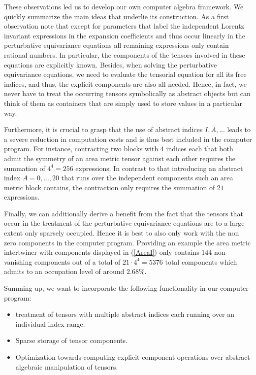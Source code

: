 These observations led us to develop our own computer algebra framework. We quickly summarize the main ideas that underlie its construction.
As a first observation note that except for parameters that label the independent Lorentz invariant expressions in the expansion coefficients and thus occur linearly in the perturbative equivariance equations all remaining expressions only contain rational numbers. In particular, the components of the tensors involved in these equations are explicitly known. Besides, when solving the perturbative equivariance equations, we need to evaluate the tensorial equation for all its free indices, and thus, the explicit components are also all needed. Hence, in fact, we never have to treat the occurring tensors symbolically as abstract objects but can think of them as containers that are simply used to store values in a particular way. 

Furthermore, it is crucial to grasp that the use of abstract indices $I, A, ...$ leads to a severe reduction in computation costs and is thus best included in the computer program. For instance, contracting two blocks with $4$ indices each that both admit the symmetry of an area metric tensor against each other requires the summation of $4^4 = 256$ expressions. In contrast to that introducing an abstract index $A = 0,...,20$ that runs over the independent components such an area metric block contains, the contraction only requires the summation of $21$ expressions.

Finally, we can additionally derive a benefit from the fact that the tensors that occur in the treatment of the perturbative equivariance equations are to a large extent only sparsely occupied. Hence it is best to also only work with the non zero components in the computer program. Providing an example the area metric intertwiner with components displayed in (\ref{AreaI}) only contains $144$ non-vanishing components out of a total of $21 \cdot 4^4 = 5376$ total components which admits to an occupation level of around $2.68 \%$.

Summing up, we want to incorporate the following functionality in our computer program:
\begin{itemize}
    \item treatment of tensors with multiple abstract indices each running over an individual index range. 
    \item Sparse storage of tensor components.
    \item Optimization towards computing explicit component operations over abstract algebraic manipulation of tensors.
\end{itemize}

